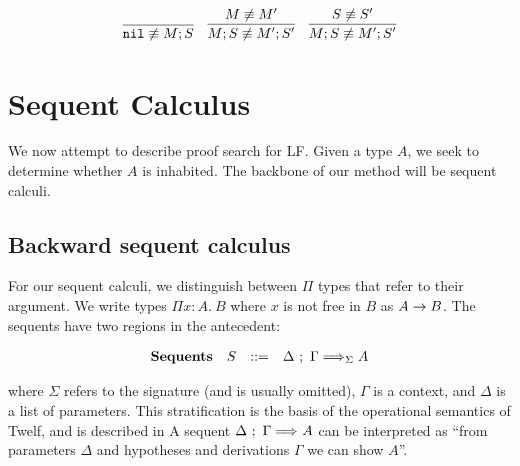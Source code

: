 \documentclass[11pt,twoside]{article}
\begin{document}
\bigskip 
{}
\bigskip 

$$
\begin{array}{ccc}
\infer{\NoEquiv{\Nil}{M;S}}{} &
\infer{\NoEquiv{M;S}{M';S'}}{\NoEquiv{M}{M'}} &
\infer{\NoEquiv{M;S}{M';S'}}{\NoEquiv{S}{S'}} 
\end{array} 
$$



\section{Sequent Calculus}

We now attempt to describe proof search for LF.
Given a type $A$, we seek to determine whether $A$ 
is inhabited. The backbone of our method will be sequent calculi.

\renewcommand{\PiTyp}[3]{\Pi #1 : #2.\ #3}
\renewcommand{\Lam}[2]{\lambda #1.\ #2}


\subsection{Backward sequent calculus}
For our sequent calculi, we distinguish between $\Pi$ types
that refer to their argument.  We write types 
$\PiTyp{x}{A}{B}$ where $x$ is not free in $B$ as
$A \to B$.  The sequents have two regions in the antecedent:

\newcommand{\Sequent}[4][]{#2\ ;\ #3 \SeqArr_{#1} #4}

$$
\begin{array}{llll}
\mathbf{Sequents} & S & ::= & \Sequent[\Sigma]{\Delta}{\Gamma}{A} \\
\end{array} 
$$

\noindent 
where $\Sigma$ refers to the signature (and is usually omitted),
$\Gamma$ is a context, and $\Delta$ is a list of parameters.   
This stratification is the basis of the operational semantics
of Twelf, and is described in 
A sequent $\Sequent{\Delta}{\Gamma}{A}$
can be interpreted as ``from parameters $\Delta$ and hypotheses 
and derivations $\Gamma$ we can show $A$''.  
\end{document}
